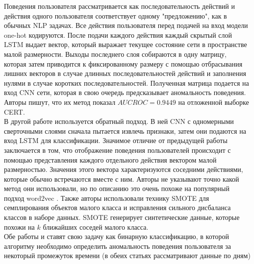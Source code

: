 Поведения пользователя рассматривается как последовательность действий и действия одного пользователя соответствует одному "предложению", как в обычных NLP задачах. Все действия пользователя перед подачей на вход модели one-hot кодируются. После подачи каждого действия каждый скрытый слой LSTM выдает вектор, который выражает текущее состояние сети в пространстве малой размерности. Выходы последнего слоя собираются в одну матрицу, которая затем приводится к фиксированному размеру с помощью отбрасывания лишних векторов в случае длинных последовательностей действий и заполнения нулями в случае коротких последовательностей. Полученная матрица подается на вход CNN сети, которая в свою очередь предсказывает аномальность поведения. Авторы пишут, что их метод показал $AUC ROC=0.9449$ на отложенной выборке CERT.\\

В другой работе \cite{saaudiInsiderThreatsDetection2019} используется обратный подход. В ней CNN с одномерными сверточными слоями сначала пытается извлечь признаки, затем они подаются на вход LSTM для классификации. Значимое отличие от предыдущей работы заключается в том, что отображение поведения пользователей происходит с помощью представления каждого отдельного действия вектором малой размерностью. Значения этого вектора характеризуются соседними действиями, которые обычно встречаются вместе с ним. Авторы не указывают точно какой метод они использовали, но по описанию это очень похоже на популярный подход word2vec \cite{mikolovEfficientEstimationWord2013a}. Также авторы использовали технику SMOTE \cite{chawlaSMOTESyntheticMinority2002} для семплирования объектов малого класса и исправления сильного дисбаланса классов в наборе данных. SMOTE генерирует синтетические данные, которые похожи на $k$ ближайших соседей малого класса.\\

Обе работы \cite{saaudiInsiderThreatsDetection2019} и \cite{yuanInsiderThreatDetection2018b} ставят свою задачу как бинарную классификацию, в которой алгоритму необходимо определить аномальность поведения пользователя за некоторый промежуток времени (в обеих статьях рассматривают данные по дням)

